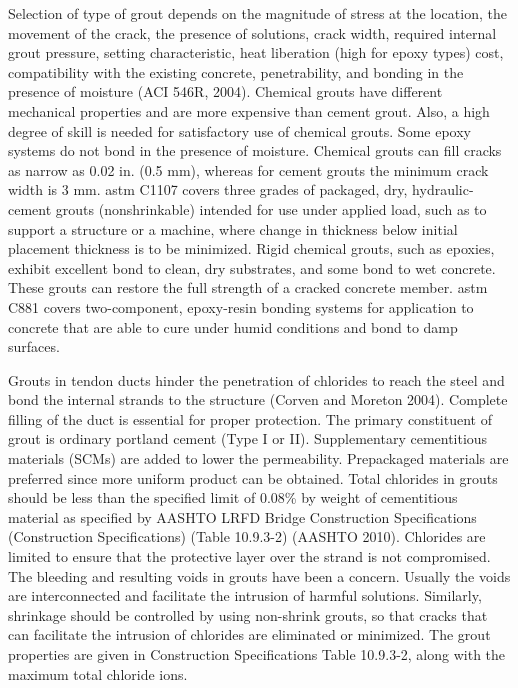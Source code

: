Selection of type of grout depends on the magnitude of stress at the location, the movement of the crack, the
presence of solutions, crack width, required internal grout pressure, setting characteristic, heat liberation (high for
epoxy types) cost, compatibility with the existing concrete, penetrability, and bonding in the presence of moisture
(ACI 546R, 2004). Chemical grouts have different mechanical properties and are more expensive than cement grout.
Also, a high degree of skill is needed for satisfactory use of chemical grouts. Some epoxy systems do not bond in the
presence of moisture. Chemical grouts can fill cracks as narrow as 0.02 in. (0.5 mm), whereas for cement grouts the
minimum crack width is 3 mm. \acrshort*{astm} C1107 covers three grades of packaged, dry, hydraulic-cement grouts
(nonshrinkable) intended for use under applied load, such as to support a structure or a machine, where change in
thickness below initial placement thickness is to be minimized. Rigid chemical grouts, such as epoxies, exhibit
excellent bond to clean, dry substrates, and some bond to wet concrete. These grouts can restore the full strength of a
cracked concrete member. \acrshort*{astm} C881 covers two-component, epoxy-resin bonding systems for application to
concrete that are able to cure under humid conditions and bond to damp surfaces.

Grouts in tendon ducts hinder the penetration of chlorides to reach the steel and bond the internal strands to the
structure (Corven and Moreton 2004). Complete filling of the duct is essential for proper protection. The primary
constituent of grout is ordinary portland cement (Type I or II). Supplementary cementitious materials (SCMs) are
added to lower the permeability. Prepackaged materials are preferred since more uniform product can be obtained.
Total chlorides in grouts should be less than the specified limit of 0.08\% by weight of cementitious material as
specified by AASHTO LRFD Bridge Construction Specifications (Construction Specifications) (Table 10.9.3-2)
(AASHTO 2010). Chlorides are limited to ensure that the protective layer over the strand is not compromised. The
bleeding and resulting voids in grouts have been a concern. Usually the voids are interconnected and facilitate the intrusion of harmful solutions. Similarly, shrinkage should be controlled by using non-shrink grouts, so that cracks
that can facilitate the intrusion of chlorides are eliminated or minimized. The grout properties are given in
Construction Specifications Table 10.9.3-2, along with the maximum total chloride ions.

